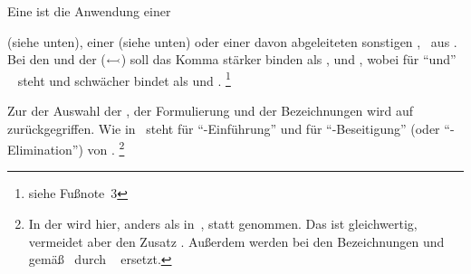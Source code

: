 Eine  ist die Anwendung einer \emph{}{ (siehe unten), einer \emph{\Basisregel} (siehe unten) oder einer davon abgeleiteten sonstigen \emph{}, \textzB\ aus .
Bei den  und der  ($\subst$) soll das Komma stärker binden als \chrqt{$\derivesym$}, \chrqt{$\subst$} und \chrqt{$\srand$},
 wobei \chrqt{$\srand$} für \enquote{und} \textbzgl\  steht und schwächer bindet als \chrqt{$\derivesym$} und \chrqt{$\subst$}.%
\footnote{siehe Fußnote~3 } %

Zur der Auswahl der \Basisregeln, der Formulierung und der Bezeichnungen wird auf~\cite{bib:Rautenberg,bib:NatuerlichesSchliessen} zurückgegriffen.
Wie in~\cite{bib:NatuerlichesSchliessen} steht  für \enquote{-Einführung} und  für \enquote{-Beseitigung} (oder \enquote{-Elimination}) von \Junktoren.%
\footnote{%
	In der  wird hier, anders als in~\cite{bib:Rautenberg},  statt  genommen. Das ist gleichwertig, vermeidet aber den Zusatz .
	Außerdem werden bei den Bezeichnungen  und  gemäß~\cite{bib:NatuerlichesSchliessen} durch \seqqt{$\andE$} \textbzw\ \seqqt{$\andB$} ersetzt.
}

}
